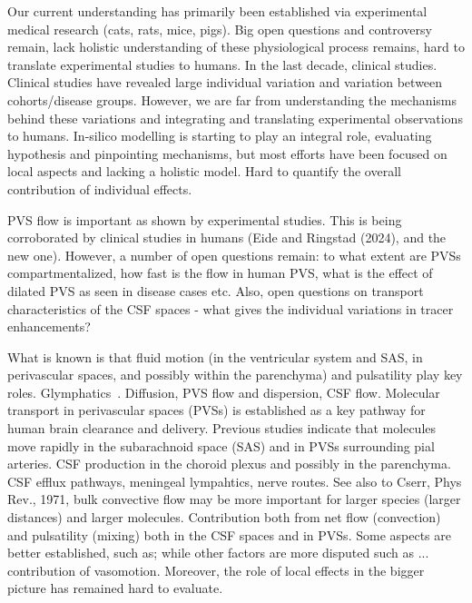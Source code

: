 \documentclass[fleqn,10pt]{wlscirep}
\begin{document}
Our current understanding has primarily been established via
experimental medical research (cats, rats, mice, pigs). Big open
questions and controversy remain, lack holistic understanding of these
physiological process remains, hard to translate experimental studies
to humans. In the last decade, clinical studies. Clinical studies have
revealed large individual variation and variation between
cohorts/disease groups. However, we are far from understanding the
mechanisms behind these variations and integrating and translating
experimental observations to humans.  In-silico modelling is starting
to play an integral role, evaluating hypothesis and pinpointing
mechanisms, but most efforts have been focused on local aspects and
lacking a holistic model. Hard to quantify the overall contribution of
individual effects.

PVS flow is important as shown by experimental studies. This is being
corroborated by clinical studies in humans (Eide and Ringstad (2024),
and the new one). However, a number of open questions remain: to what
extent are PVSs compartmentalized, how fast is the flow in human PVS,
what is the effect of dilated PVS as seen in disease cases etc.  Also,
open questions on transport characteristics of the CSF spaces - what
gives the individual variations in tracer enhancements? 

What is known is that fluid motion (in the ventricular system and SAS,
in perivascular spaces, and possibly within the parenchyma) and
pulsatility play key
roles. Glymphatics~\cite{iliff2012paravascular}. Diffusion, PVS flow
and dispersion, CSF flow. Molecular transport in perivascular spaces
(PVSs) is established as a key pathway for human brain clearance and
delivery. Previous studies indicate that molecules move rapidly in the
subarachnoid space (SAS) and in PVSs surrounding pial arteries. CSF
production in the choroid plexus and possibly in the parenchyma. CSF
efflux pathways, meningeal lympahtics, nerve routes. See also to
Cserr, Phys Rev., 1971, bulk convective flow may be more important for
larger species (larger distances) and larger molecules. Contribution
both from net flow (convection) and pulsatility (mixing) both in the
CSF spaces and in PVSs. Some aspects are better established, such as;
while other factors are more disputed such as ... contribution of
vasomotion. Moreover, the role of local effects in the bigger picture
has remained hard to evaluate.
\end{document}
